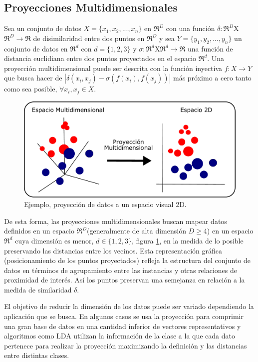 		\subsection{Proyecciones Multidimensionales}
		\begin{defn}
		 Sea un conjunto de datos $X=\{x_1,x_2,...,x_n\}$ en $\Re^D$ con una función $\delta:\Re^D$X$\Re^D \to \Re$ de disimilaridad entre dos puntos en $\Re^D$ y sea $Y=\{y_1,y_2,...,y_n\}$ un conjunto de datos en $\Re^d$ con $d=\{1,2,3\}$  y $\sigma:\Re^d$X$\Re^d \to \Re$ una función de distancia euclidiana entre dos puntos proyectados en el espacio $\Re^d$. Una proyección multidimensional puede ser descrita con la función inyectiva $f:X \to Y$ que busca hacer de $|\delta(x_i,x_j)-\sigma(f(x_i),f(x_j))|$ más próximo  a cero tanto como sea posible, $ \forall x_i,x_j \in X$.\end{defn} 
\begin{figure}[!h]
\centering
\includegraphics[width=0.6\columnwidth]{figs/PM.pdf}%
\caption{Ejemplo, proyección de datos a un espacio visual 2D.}%
\label{fig:PM}%
\end{figure}
De esta forma, las proyecciones multidimensionales buscan mapear datos definidos en un espacio $\Re^D$(generalmente de alta dimensión $D\geq 4$) en un espacio $\Re^d$ cuya dimensión es menor, $d  \in \{1,2,3\}$, figura \ref{fig:PM}, en la medida de lo posible preservando las distancias entre los vecinos. Esta representación gráfica (posicionamiento de los puntos proyectados) refleja la estructura del conjunto de datos en términos de agrupamiento entre las instancias y otras relaciones de proximidad de interés. Así los puntos preservan una semejanza en relación a la medida de similaridad $\delta$.

El objetivo de reducir la dimensión de los datos puede ser variado dependiendo la aplicación que se busca. En algunos casos se usa la proyección para comprimir una gran base de datos en una cantidad inferior de vectores  representativos \cite{Kohonen2001SM} y algoritmos como \ac{LDA} utilizan la información de la clase a la que cada dato pertenece para realizar la proyección maximizando la definición y las distancias entre distintas clases. 


